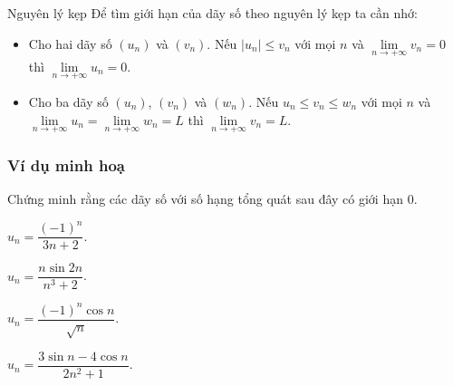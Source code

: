 
\begin{dang}{Nguyên lý kẹp}
		Để tìm giới hạn của dãy số theo nguyên lý kẹp ta cần nhớ:
	\begin{itemize}
		\item Cho hai dãy số $(u_n)$ và $(v_n)$. Nếu $|u_n| \leq v_n$ với mọi $n$ và $\lim \limits_{n \to +\infty}v_n = 0$ thì $\lim \limits_{n \to +\infty}u_n =0$.
		\item Cho ba dãy số $(u_n)$, $(v_n)$ và $(w_n)$. Nếu $ u_n \leq v_n \leq w_n$ với mọi $n$ và $\lim \limits_{n \to +\infty}u_n = \lim \limits_{n \to +\infty}w_n = L$ thì $\lim \limits_{n \to +\infty}v_n = L$.
	\end{itemize}
\end{dang}
\subsubsection{Ví dụ minh hoạ}
\begin{vd}%
	Chứng minh rằng các dãy số với số hạng tổng quát sau đây có giới hạn $0$.
	\begin{enumEX}[a)]{2}
		\item $u_n=\dfrac{(-1)^n}{3n+2}$.
		\item $u_n=\dfrac{n\sin 2n}{n^3+2}$.
		\item $u_n=\dfrac{(-1)^n\cos n}{\sqrt{n}}$.
		\item $u_n=\dfrac{3\sin n-4\cos n}{2n^2+1}$.
	\end{enumEX}
\end{vd}
